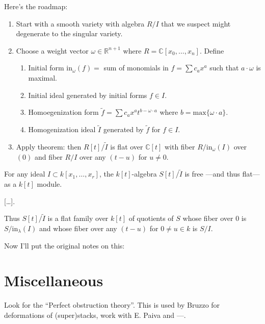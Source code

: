 \noindent
Here's the roadmap:
\begin{enumerate}
\item Start with a smooth variety
with algebra $R/I$ that we suspect
might degenerate to the singular
variety.

\item Choose a weight vector
$\omega \in \mathbb{R}^{n+1}$
where $R = \mathbb{C}[x_0,…,x_n]$.
Define
\begin{enumerate}
\item Initial form
$\text{in}_\omega(f) = $
sum of monomials in $f= \sum c_a x^a$
such that $a\cdot \omega$
is maximal.

\item Initial ideal generated
by initial forms $f \in I$.

\item Homoegenization form
$\tilde{f} = \sum c_a x^at^{b-\omega\cdot a}$
where $b = \text{max}\{\omega \cdot a\}$.

\item Homogenization ideal $\tilde{I}$
generated by $\tilde{f}$ for $f \in I$.
\end{enumerate}
\item Apply theorem: then
$R[t]/\tilde{I}$
is flat over $\mathbb{C}[t]$
with fiber $R/\text{in}_\omega(I)$
over $(0)$ and fiber $R/I$ over 
any $(t-u)$ for $u\neq 0$.
\end{enumerate}

\begin{theorem}
\label{theorem-grobner-flat-morphism}
For any ideal $I \subset k[x_1,\ldots,x_r]$,
the $k[t]$-algebra $S[t]/\tilde{I}$ is free
---and thus flat--- as a $k[t]$ module.

[…].

Thus $S[t]/\tilde{I}$ is a flat family over
$k[t]$ of quotients of $S$ whose fiber over
$0$ is $S/\text{in}_\lambda(I)$ and whose
fiber over any $(t-u)$ for $0 \neq u \in k$
is $S/I$.

\end{theorem}

\medskip\noindent
Now I'll put the original notes on this:


\section{Miscellaneous}
\label{section-misc}

Look for the ``Perfect obstruction theory''.
This is used by Bruzzo for deformations of
(super)stacks,
work with E. Paiva and ---.






